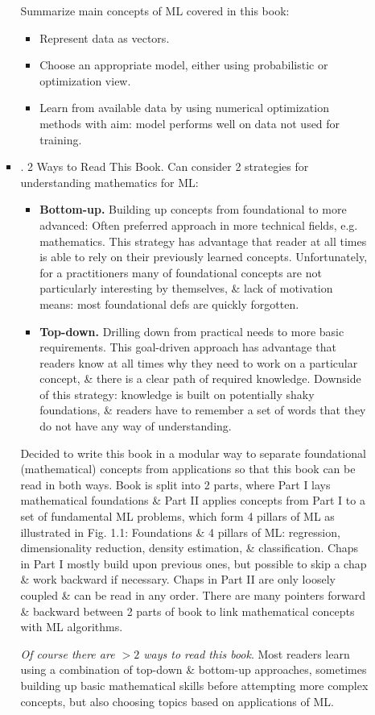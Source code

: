 \documentclass{article}
\begin{document}
\begin{enumerate}
\begin{itemize}
\begin{itemize}
			Summarize main concepts of ML covered in this book:
			\begin{itemize}
				\item Represent data as vectors.
				\item Choose an appropriate model, either using probabilistic or optimization view.
				\item Learn from available data by using numerical optimization methods with aim: model performs well on data not used for training.
			\end{itemize}
			\item {. 2 Ways to Read This Book.} Can consider 2 strategies for understanding mathematics for ML:
			\begin{itemize}
				\item {\bf Bottom-up.} Building up concepts from foundational to more advanced: Often preferred approach in more technical fields, e.g. mathematics. This strategy has advantage that reader at all times is able to rely on their previously learned concepts. Unfortunately, for a practitioners many of foundational concepts are not particularly interesting by themselves, \& lack of motivation means: most foundational defs are quickly forgotten.
				\item {\bf Top-down.} Drilling down from practical needs to more basic requirements. This goal-driven approach has advantage that readers know at all times why they need to work on a particular concept, \& there is a clear path of required knowledge. Downside of this strategy: knowledge is built on potentially shaky foundations, \& readers have to remember a set of words that they do not have any way of understanding.
			\end{itemize}
			Decided to write this book in a modular way to separate foundational (mathematical) concepts from applications so that this book can be read in both ways. Book is split into 2 parts, where Part I lays mathematical foundations \& Part II applies concepts from Part I to a set of fundamental ML problems, which form 4 pillars of ML as illustrated in {\sf Fig. 1.1: Foundations \& 4 pillars of ML}: regression, dimensionality reduction, density estimation, \& classification. Chaps in Part I mostly build upon previous ones, but possible to skip a chap \& work backward if necessary. Chaps in Part II are only loosely coupled \& can be read in any order. There are many pointers forward \& backward between 2 parts of book to link mathematical concepts with ML algorithms.
			
			{\it Of course there are $> 2$ ways to read this book}. Most readers learn using a combination of top-down \& bottom-up approaches, sometimes building up basic mathematical skills before attempting more complex concepts, but also choosing topics based on applications of ML.
			

\end{itemize}
\end{itemize}
\end{enumerate}
\end{document}
